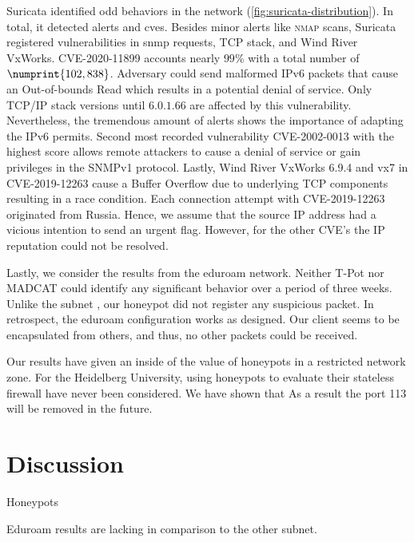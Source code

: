 Suricata identified odd behaviors in the network (\autoref{fig:suricata-distribution}).
In total, it detected  alerts and \acsp{cve}.
Besides minor alerts like \textsc{nmap} scans, Suricata registered vulnerabilities in \ac{snmp} requests, TCP stack, and Wind River VxWorks.
CVE-2020-11899 \cite{CVE-2020-11899} accounts nearly $99\%$ with a total number of $\numprint{102,838}$.
Adversary could send malformed IPv6 packets that cause an Out-of-bounds Read which results in a potential denial of service.
Only TCP/IP stack versions until $6.0.1.66$ are affected by this vulnerability.
Nevertheless, the tremendous amount of alerts shows the importance of adapting the IPv6 permits.
Second most recorded vulnerability CVE-2002-0013 \cite{CVE-2002-0013} with the highest score allows remote attackers to cause a denial of service or gain privileges in the SNMPv1 protocol. 
Lastly, Wind River VxWorks 6.9.4 and vx7 in CVE-2019-12263 \cite{CVE-2019-12263} cause a Buffer Overflow due to underlying TCP components resulting in a race condition.
Each connection attempt with CVE-2019-12263 originated from Russia.
Hence, we assume that the source IP address had a vicious intention to send an urgent flag.
However, for the other CVE's the IP reputation could not be resolved.

Lastly, we consider the results from the eduroam network.
Neither T-Pot nor MADCAT could identify any significant behavior over a period of three weeks.
Unlike the subnet , our honeypot did not register any suspicious packet.
In retrospect, the eduroam configuration works as designed.
Our client seems to be encapsulated from others, and thus, no other packets could be received.

Our results have given an inside of the value of honeypots in a restricted network zone.
For the Heidelberg University, using honeypots to evaluate their stateless firewall have never been considered.
We have shown that 
As a result the port 113 will be removed in the future.

\begin{figure}
    
\end{figure}

\begin{figure}
    
\end{figure}

\section{Discussion}

Honeypots 

Eduroam results are lacking in comparison to the other subnet.

